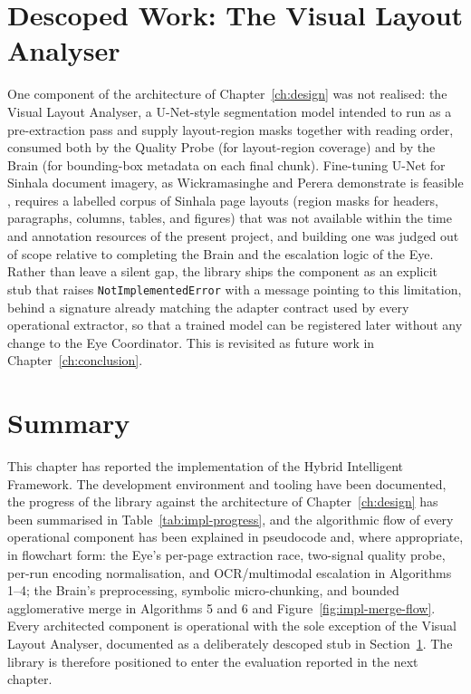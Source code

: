 \documentclass[12pt,a4paper,oneside]{report}
\begin{document}
\section{Descoped Work: The Visual Layout Analyser}
\label{sec:impl-forthcoming}
One component of the architecture of Chapter~\ref{ch:design} was not realised: the Visual Layout Analyser, a U-Net-style segmentation model intended to run as a pre-extraction pass and supply layout-region masks together with reading order, consumed both by the Quality Probe (for layout-region coverage) and by the Brain (for bounding-box metadata on each final chunk). Fine-tuning U-Net for Sinhala document imagery, as Wickramasinghe and Perera demonstrate is feasible \cite{wickramasinghe2024unet}, requires a labelled corpus of Sinhala page layouts (region masks for headers, paragraphs, columns, tables, and figures) that was not available within the time and annotation resources of the present project, and building one was judged out of scope relative to completing the Brain and the escalation logic of the Eye. Rather than leave a silent gap, the library ships the component as an explicit stub that raises \texttt{NotImplementedError} with a message pointing to this limitation, behind a signature already matching the adapter contract used by every operational extractor, so that a trained model can be registered later without any change to the Eye Coordinator. This is revisited as future work in Chapter~\ref{ch:conclusion}.

\section{Summary}
\label{sec:ch6-summary}
This chapter has reported the implementation of the Hybrid Intelligent Framework. The development environment and tooling have been documented, the progress of the library against the architecture of Chapter~\ref{ch:design} has been summarised in Table~\ref{tab:impl-progress}, and the algorithmic flow of every operational component has been explained in pseudocode and, where appropriate, in flowchart form: the Eye's per-page extraction race, two-signal quality probe, per-run encoding normalisation, and OCR/multimodal escalation in Algorithms 1--4; the Brain's preprocessing, symbolic micro-chunking, and bounded agglomerative merge in Algorithms 5 and 6 and Figure~\ref{fig:impl-merge-flow}. Every architected component is operational with the sole exception of the Visual Layout Analyser, documented as a deliberately descoped stub in Section~\ref{sec:impl-forthcoming}. The library is therefore positioned to enter the evaluation reported in the next chapter.
\end{document}
